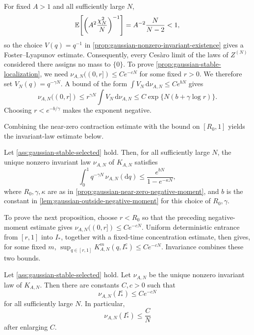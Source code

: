 \documentclass[11pt,reqno,a4paper]{article}
\newcommand{\Ee}{\E}
\begin{document}
\begin{remark}
\label{rem:gaussian-power-law-lyapunov}
  For fixed $A>1$ and all sufficiently large $N$,
  \begin{equation*}
    \Ee\left[\left(A^2\frac{\chi_N^2}{N}\right)^{-1}\right]
    =A^{-2}\frac{N}{N-2}<1,
  \end{equation*}
  so the choice $V(q)=q^{-1}$ in
  \cref{prop:gaussian-nonzero-invariant-existence} gives a Foster--Lyapunov
  estimate. Consequently, every Ces\`aro limit of the laws of $Z^{(N)}$
  considered there assigns no mass to $\{0\}$. To prove
  \cref{prop:gaussian-stable-localization}, we need
  $\nu_{A,N}((0,r])\leq Ce^{-cN}$ for some fixed $r>0$. We therefore set
  $V_N(q)=q^{-\gamma N}$. A bound of the form
  $\int V_N\,\mathrm{d}\nu_{A,N}\leq Ce^{bN}$ gives
  \begin{equation*}
    \nu_{A,N}((0,r])
    \leq
    r^{\gamma N}\int V_N\,\mathrm{d}\nu_{A,N}
    \leq
    C\exp\{N(b+\gamma\log r)\}.
  \end{equation*}
  Choosing $r<e^{-b/\gamma}$ makes the exponent negative.
\end{remark}

Combining the near-zero contraction estimate with the bound on $[R_0,1]$
yields the invariant-law estimate below.
\begin{proposition}
\label{prop:gaussian-stationary-negative-moment}
  Let \cref{ass:gaussian-stable-selected} hold. Then, for all sufficiently large
  $N$, the unique nonzero invariant law $\nu_{A,N}$ of $K_{A,N}$ satisfies
  \begin{equation}\label{eq:gaussian-stationary-negative-moment}
    \int_0^1 q^{-\gamma N}\,\nu_{A,N}(\mathrm{d}q)
    \leq
    \frac{e^{bN}}{1-e^{-\kappa N}},
  \end{equation}
  where $R_0,\gamma,\kappa$ are as in
  \cref{prop:gaussian-near-zero-negative-moment}, and $b$ is the constant in
  \cref{lem:gaussian-outside-negative-moment} for this choice of $R_0,\gamma$.
\end{proposition}

To prove the next proposition, choose $r<R_0$ so that the preceding
negative-moment estimate gives $\nu_{A,N}((0,r])\leq Ce^{-cN}$. Uniform
deterministic entrance from $[r,1]$ into $I_\ast$, together with a fixed-time
concentration estimate, then gives, for some fixed $m$,
$\sup_{q\in[r,1]}K_{A,N}^m(q,I_\ast^c)\leq Ce^{-cN}$. Invariance combines
these two bounds.
\begin{proposition}
\label{prop:gaussian-stable-localization}
  Let \cref{ass:gaussian-stable-selected} hold. Let $\nu_{A,N}$ be the unique
  nonzero invariant law of $K_{A,N}$. Then there are constants $C,c>0$ such that
  \begin{equation}\label{eq:gaussian-stationary-exponential-localization}
    \nu_{A,N}(I_\ast^c)\leq C e^{-cN}
  \end{equation}
  for all sufficiently large $N$. In particular,
  \begin{equation}\label{eq:gaussian-stationary-localization}
    \nu_{A,N}(I_\ast^c)\leq\frac{C}{N}
  \end{equation}
  after enlarging $C$.
\end{proposition}
\end{document}
